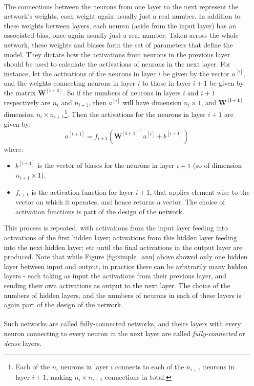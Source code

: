 \documentclass[11pt]{article} %
\theoremstyle{plain}
\theoremstyle{definition}
\begin{document}
\\
\noindent
The connections between the neurons from one layer to the next represent the network's weights, each weight again usually just a real number. In addition to these weights between layers, each neuron (aside from the input layer) has an associated bias, once again usually just a real number. Taken across the whole network, these weights and biases form the set of parameters that define the model. They dictate how the activations from neurons in the previous layer should be used to calculate the activations of neurons in the next layer. For instance, let the activations of the neurons in layer \(i\) be given by the vector \(a^{[i]}\), and the weights connecting neurons in layer \(i\) to those in layer \(i+1\) be given by the matrix \(\mathbf{W^{[i+1]}}\). So if the numbers of neurons in layers \(i\) and \(i+1\) respectively are \(n_i\) and \(n_{i+1}\), then \(a^{[i]}\) will have dimension \(n_i \times 1\), and \(\mathbf{W^{[i+1]}}\) dimension \(n_i \times n_{i+1}\)\footnote{Each of the \(n_i\) neurons in layer \(i\) connects to each of the \(n_{i+1}\) neurons in layer \(i+1\), making \({n_i} \times n_{i+1}\) connections in total.}. Then the activations for the neurons in layer \(i+1\) are given by:
\[a^{[i+1]} = f_{i+1}(\mathbf{{W^{[i+1]}}^{\top}}a^{[i]} + b^{[i+1]}) \]
where:
\begin{itemize}
  \item \(b^{[i+1]}\) is the vector of biases for the neurons in layer \(i+1\) (so of dimension \(n_{i+1} \times 1\)). 
  \item \(f_{i+1}\) is the activation function for layer \(i+1\), that applies element-wise to the vector on which it operates, and hence returns a vector. The choice of activation functions is part of the design of the network.   
\end{itemize}
This process is repeated, with activations from the input layer feeding into activations of the first hidden layer; activations from this hidden layer feeding into the next hidden layer; etc until the final activations in the output layer are produced. Note that while Figure \ref{fig:simple_ann} above showed only one hidden layer between input and output, in practice there can be arbitrarily many hidden layers - each taking as input the activations from their previous layer, and sending their own activations as output to the next layer. The choice of the numbers of hidden layers, and the numbers of neurons in each of these layers is again part of the design of the network. 
\\
\\
\noindent
Such networks are called fully-connected networks, and theirs layers with every neuron connecting to every neuron in the next layer are called \textit{fully-connected} or \textit{dense} layers.   
\end{document}
